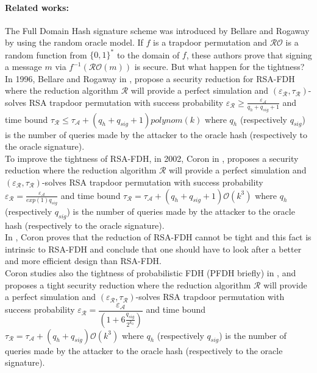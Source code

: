 \documentclass[a4paper,11pt]{article}
\begin{document}
\paragraph{Related works:}
The Full Domain Hash signature scheme was introduced by Bellare and Rogaway \cite{Bellare2}   by using the random oracle model. If $f$ is a trapdoor permutation and $\mathcal{RO}$ is a random function from $\{0, 1\}^{*}$ to the domain of $f$, these authors prove that signing a message $m$ via $f^{-1}(\mathcal{RO}(m))$ is secure. But what happen for the tightness?\\
In 1996,  Bellare and Rogaway in \cite{Bellare2}, propose a security reduction for RSA-FDH where the reduction algorithm  $\mathcal{R}$
 will provide a perfect simulation and $(\varepsilon_{\mathcal{R}}, \tau_{\mathcal{R}})$-solves RSA trapdoor permutation with success probability $\varepsilon_{\mathcal{R}} \geq \frac{\varepsilon_{\mathcal{A}}}{q_{h}+q_{sig}+1}$ and time bound $\tau_{\mathcal{R}}\leq \tau_{\mathcal{A}} + (q_{h}+q_{sig}+1)polynom(k)$ where $q_{h}$ (respectively $q_{sig}$) is the number of queries made by  the attacker to the oracle hash (respectively to the oracle signature).\\
To improve the tightness of RSA-FDH,  in 2002, Coron in \cite{Coron-FDH}, proposes a security reduction where the reduction algorithm  $\mathcal{R}$ will provide a perfect simulation and $(\varepsilon_{\mathcal{R}}, \tau_{\mathcal{R}})$-solves RSA trapdoor permutation with success probability $\varepsilon_{\mathcal{R}} = \frac{\varepsilon_{\mathcal{A}}}{exp(1)q_{sig}}$ and time bound $\tau_{\mathcal{R}}= \tau_{\mathcal{A}} + (q_{h}+q_{sig}+1)\mathcal{O}(k^3)$ where $q_{h}$ (respectively $q_{sig}$) is the number of queries made by  the attacker to the oracle hash (respectively to the oracle signature).\\
In  \cite{Coron-GHR-PSS}, Coron proves that the reduction of RSA-FDH cannot be tight and this fact is intrinsic to RSA-FDH and conclude that one should have to look after a better and  more efficient design than RSA-FDH.\\
Coron studies also the tightness of probabilistic FDH (PFDH briefly)  in \cite{Coron-GHR-PSS}, and  proposes a tight security reduction where the reduction algorithm  $\mathcal{R}$ will provide a perfect simulation and $(\varepsilon_{\mathcal{R}}, \tau_{\mathcal{R}})$-solves RSA trapdoor permutation with success probability $\varepsilon_{\mathcal{R}} = \dfrac{\varepsilon_{\mathcal{A}}}{(1+6\frac{q_{sig}}{2^{k_{0}}})}$ and time bound $\tau_{\mathcal{R}}= \tau_{\mathcal{A}} + (q_{h}+q_{sig})\mathcal{O}(k^3)$ where $q_{h}$ (respectively $q_{sig}$) is the number of queries made by  the attacker to the oracle hash (respectively to the oracle signature).\\
\end{document}
